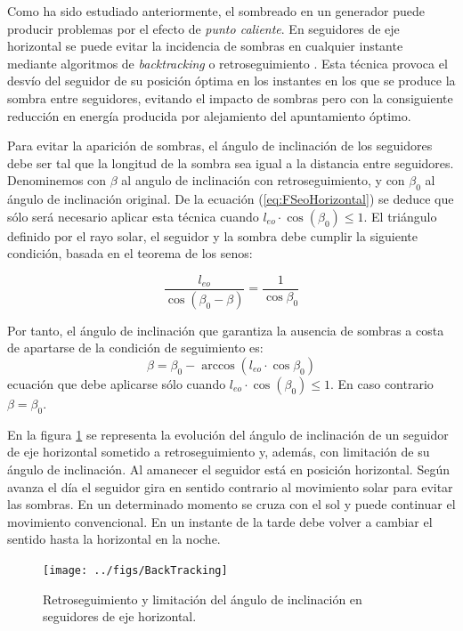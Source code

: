 Como ha sido estudiado anteriormente, el sombreado en un generador puede producir problemas por
el efecto de \emph{punto caliente}. En seguidores de eje horizontal se puede evitar la incidencia
de sombras en cualquier instante mediante algoritmos de
\emph{backtracking} o retroseguimiento
\cite{Panico.Garvison.ea1991}. Esta técnica provoca el desvío del seguidor de su posición óptima en los
instantes en los que se produce la sombra entre seguidores, evitando
el impacto de sombras pero con la consiguiente reducción en energía
producida por alejamiento del apuntamiento óptimo.

Para evitar la
aparición de sombras, el ángulo de inclinación de los seguidores debe
ser tal que la longitud de la sombra sea igual a la distancia entre
seguidores. Denominemos con $\beta$ al angulo de inclinación con
retroseguimiento, y con $\beta_0$ al ángulo de inclinación
original. De la ecuación (\ref{eq:FSeoHorizontal}) se deduce que
sólo será necesario aplicar esta técnica cuando $l_{eo} \cdot \cos(\beta_0) \leq 1$. El
triángulo definido por el rayo solar, el seguidor y la sombra debe
cumplir la siguiente condición, basada en el teorema de los senos:

\begin{equation}
  \label{eq:BT_senos}
  \frac{l_{eo}}{\cos(\beta_0-\beta)}=\frac{1}{\cos{\beta_0}}
\end{equation}

Por tanto, el ángulo de inclinación que garantiza la ausencia de
sombras a costa de apartarse de la condición de seguimiento es:
\begin{equation}
  \label{eq:retroseguimiento}
  \beta=\beta_0-\arccos(l_{eo}\cdot\cos{\beta_0})  
\end{equation}
ecuación que debe aplicarse sólo cuando $l_{eo} \cdot
\cos(\beta_0) \leq 1$. En caso contrario $\beta = \beta_0$.

En la figura \ref{fig:Backtracking} se representa la evolución del
ángulo de inclinación de un seguidor de eje horizontal sometido a
retroseguimiento y, además, con limitación de su ángulo de
inclinación.  Al amanecer el seguidor está en posición
horizontal. Según avanza el día el seguidor gira en sentido
contrario al movimiento solar para evitar las sombras. En un
determinado momento se cruza con el sol y puede continuar el
movimiento convencional. En un instante de la tarde debe volver a
cambiar el sentido hasta la horizontal en la noche.  

\begin{figure}
  \centering
  \texttt{[image: ../figs/BackTracking]}
  \caption{Retroseguimiento y limitación del ángulo de inclinación
    en seguidores de eje horizontal.}
  \label{fig:Backtracking}
\end{figure}


